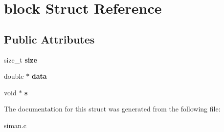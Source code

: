 \hypertarget{structblock}{
\section{block Struct Reference}
\label{structblock}
}
\subsection*{Public Attributes}
\begin{DoxyCompactItemize}
\item 
\hypertarget{structblock_a40c8e08013eb90aa6db19e1cbc7f3186}{
size\_\-t {\bfseries size}}
\label{structblock_a40c8e08013eb90aa6db19e1cbc7f3186}

\item 
\hypertarget{structblock_ae23f6fbe96edf7ac42735332d9988012}{
double $\ast$ {\bfseries data}}
\label{structblock_ae23f6fbe96edf7ac42735332d9988012}

\item 
\hypertarget{structblock_a0aedba5744a9d1efd18da8cb51975274}{
void $\ast$ {\bfseries s}}
\label{structblock_a0aedba5744a9d1efd18da8cb51975274}

\end{DoxyCompactItemize}


The documentation for this struct was generated from the following file:\begin{DoxyCompactItemize}
\item 
siman.c\end{DoxyCompactItemize}
